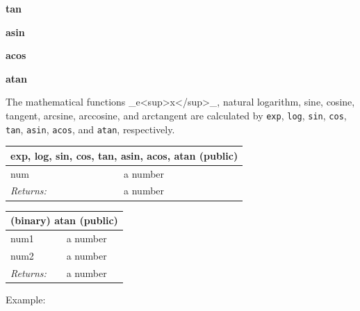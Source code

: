 \documentclass[twoside,9pt]{report}
\begin{document}
\textbf{tan}


\textbf{asin}


\textbf{acos}


\textbf{atan}


The mathematical functions \_e<sup>x</sup>\_, natural logarithm, sine, cosine, tangent, arcsine, arccosine, and arctangent are calculated by \texttt{exp}, \texttt{log}, \texttt{sin}, \texttt{cos}, \texttt{tan}, \texttt{asin}, \texttt{acos}, and \texttt{atan}, respectively.

\begin{tabular}{ |l l| }
\hline
\multicolumn{2}{|l|}{exp, log, sin, cos, tan, asin, acos, atan (public)} \\
\hline
num & a number \\
\textit{Returns:} & a number \\
\hline
\end{tabular}

\begin{tabular}{ |l l| }
\hline
\multicolumn{2}{|l|}{(binary) atan (public)} \\
\hline
num1 & a number \\
num2 & a number \\
\textit{Returns:} & a number \\
\hline
\end{tabular}


Example:
\end{document}
